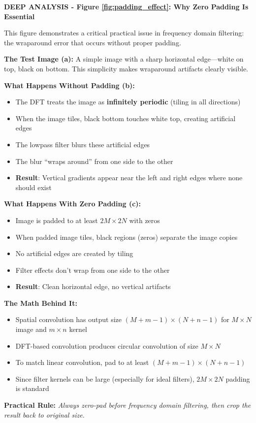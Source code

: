 \documentclass[12pt,a4paper]{article}
\begin{document}
\begin{deepexplanation}
\textbf{DEEP ANALYSIS - Figure \ref{fig:padding_effect}: Why Zero Padding Is Essential}

This figure demonstrates a critical practical issue in frequency domain filtering: the wraparound error that occurs without proper padding.

\textbf{The Test Image (a):}
A simple image with a sharp horizontal edge---white on top, black on bottom. This simplicity makes wraparound artifacts clearly visible.

\textbf{What Happens Without Padding (b):}
\begin{itemize}
    \item The DFT treats the image as \textbf{infinitely periodic} (tiling in all directions)
    \item When the image tiles, black bottom touches white top, creating artificial edges
    \item The lowpass filter blurs these artificial edges
    \item The blur ``wraps around'' from one side to the other
    \item \textbf{Result}: Vertical gradients appear near the left and right edges where none should exist
\end{itemize}

\textbf{What Happens With Zero Padding (c):}
\begin{itemize}
    \item Image is padded to at least $2M \times 2N$ with zeros
    \item When padded image tiles, black regions (zeros) separate the image copies
    \item No artificial edges are created by tiling
    \item Filter effects don't wrap from one side to the other
    \item \textbf{Result}: Clean horizontal edge, no vertical artifacts
\end{itemize}

\textbf{The Math Behind It:}
\begin{itemize}
    \item Spatial convolution has output size $(M+m-1) \times (N+n-1)$ for $M \times N$ image and $m \times n$ kernel
    \item DFT-based convolution produces circular convolution of size $M \times N$
    \item To match linear convolution, pad to at least $(M+m-1) \times (N+n-1)$
    \item Since filter kernels can be large (especially for ideal filters), $2M \times 2N$ padding is standard
\end{itemize}

\textbf{Practical Rule:}
\textit{Always zero-pad before frequency domain filtering, then crop the result back to original size.}
\end{deepexplanation}
\end{document}
